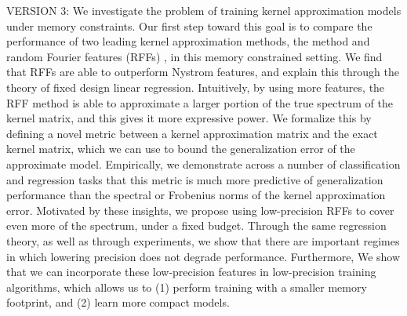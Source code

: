 VERSION 3: We investigate the problem of training kernel approximation models under memory constraints.  Our first step toward this goal is to compare the performance of two leading kernel approximation methods, the \Nystrom method \citep{nystrom} and random Fourier features (RFFs) \cite{rahimi07random}, in this memory constrained setting.
We find that RFFs are able to outperform Nystrom features, and explain this through the theory of fixed design linear regression.  Intuitively, by using more features, the RFF method is able to approximate a larger portion of the true spectrum of the kernel matrix, and this gives it more expressive power.  We formalize this by defining a novel metric between a kernel approximation matrix and the exact kernel matrix, which we can use to bound the generalization error of the approximate model.
Empirically, we demonstrate across a number of classification and regression tasks that this metric is much more predictive of generalization performance than the spectral or Frobenius norms of the kernel approximation error. 
Motivated by these insights, we propose using low-precision RFFs to cover even more of the spectrum, under a fixed budget.  Through the same regression theory, as well as through experiments, we show that there are important regimes in which lowering precision does not degrade performance.  Furthermore, We show that we can incorporate these low-precision features in low-precision training algorithms, which allows us to (1) perform training with a smaller memory footprint, and (2) learn more compact models.

